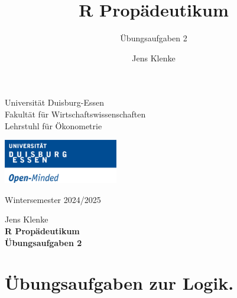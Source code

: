 \documentclass[12pt,a4paper]{article}
\title{R Propädeutikum}
\subtitle{Übungsaufgaben 2}
\author{Jens Klenke}
\date{}
\begin{document}





\restoregeometry



\begin{minipage}{0.6\textwidth}
Universität Duisburg-Essen\\
Fakultät für Wirtschaftswissenschaften\\
Lehrstuhl für Ökonometrie\\
\end{minipage}

	\begin{flushright}
	\vspace{-3cm}
	\includegraphics*[width=5cm]{includes/duelogo_en.png}\\
	\vspace{.125cm}
	\end{flushright}
\hspace{-0.005cm}Wintersemester 2024/2025

\vspace{0.05cm}

\begin{center}
	\vspace{.25cm}
	Jens Klenke \hspace{.5cm}  \\
	\vspace{.25cm}
	\textbf{\Large{R Propädeutikum}}\\
	\vspace{.25cm}
	\textbf{\large{Übungsaufgaben 2}}\\
	\vspace{.125cm}
\end{center}





\section{Übungsaufgaben zur Logik.}\label{uxfcbungsaufgaben-zur-logik.}
\end{document}
